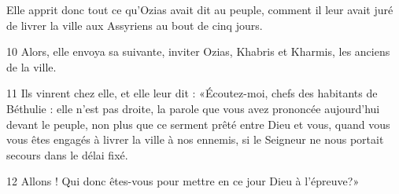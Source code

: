 
Elle apprit donc tout ce qu'Ozias avait dit au peuple, comment il leur avait juré de livrer la ville aux Assyriens au bout de cinq jours.

10 Alors, elle envoya sa suivante, inviter Ozias, Khabris et Kharmis, les anciens de la ville.

11 Ils vinrent chez elle, et elle leur dit : «Écoutez-moi, chefs des habitants de Béthulie : elle n'est pas droite, la parole que vous avez prononcée aujourd'hui devant le peuple, non plus que ce serment prêté entre Dieu et vous, quand vous vous êtes engagés à livrer la ville à nos ennemis, si le Seigneur ne nous portait secours dans le délai fixé.

12 Allons ! Qui donc êtes-vous pour mettre en ce jour Dieu à l'épreuve?»
